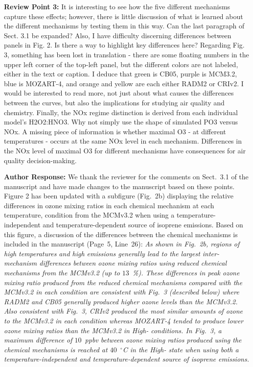 \documentclass{article}
\DeclareRobustCommand*\degree{\ensuremath{^{\circ}}}
\begin{document}
\textbf{Review Point 3:} It is interesting to see how the five different mechanisms capture these effects; however, there is little discussion of what is learned about the different mechanisms by testing them in this way. Can the last paragraph of Sect. 3.1 be expanded? Also, I have difficulty discerning differences between panels in Fig. 2. Is there a way to highlight key differences here? Regarding Fig. 3, something has been lost in translation - there are some floating numbers in the upper left corner of the top-left panel, but the different colors are not labeled, either in the text or caption. I deduce that green is CB05, purple is MCM3.2, blue is MOZART-4, and orange and yellow are each either RADM2 or CRIv2. I would be interested to read more, not just about what causes the differences between the curves, but also the implications for studying air quality and chemistry. Finally, the NOx regime distinction is derived from each individual model's H2O2:HNO3. Why not simply use the shape of simulated PO3 versus NOx. A missing piece of information is whether maximal O3 - at different temperatures - occurs at the same NOx level in each mechanism. Differences in the NOx level of maximal O3 for different mechanisms have consequences for air quality decision-making.

\textbf{Author Response:} We thank the reviewer for the comments on Sect.~3.1 of the manuscript and have made changes to the manuscript based on these points.
Figure 2 has been updated with a subfigure (Fig.~2b) displaying the relative differences in ozone mixing ratios in each chemical mechanism at each temperature,  condition from the MCMv3.2 when using a temperature-independent and temperature-dependent source of isoprene emissions. Based on this figure, a discussion of the differences between the chemical mechanisms is included in the manuscript (Page~5, Line~26):
\textit{
As shown in Fig.~2b, regions of high temperatures and high  emissions generally lead to the largest inter-mechanism differences between ozone mixing ratios using reduced chemical mechanisms from the MCMv3.2 (up to $13$~\%).
These differences in peak ozone mixing ratio produced from the reduced chemical mechanisms compared with the MCMv3.2 in each  condition are consistent with Fig.~3 (described below) where RADM2 and CB05 generally produced higher ozone levels than the MCMv3.2.
Also consistent with Fig.~3, CRIv2 produced the most similar amounts of ozone to the MCMv3.2 in each  condition whereas MOZART-4 tended to produce lower ozone mixing ratios than the MCMv3.2 in High- conditions.
In Fig.~3, a maximum difference of $10$~ppbv between ozone mixing ratios produced using the chemical mechanisms is reached at $40$~\degree C in the High- state when using both a temperature-independent and temperature-dependent source of isoprene emissions.
}
\end{document}
